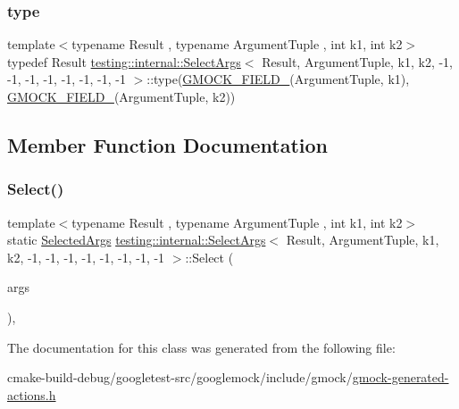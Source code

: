 \subsubsection{\texorpdfstring{type}{type}}
{\footnotesize\ttfamily template$<$typename Result , typename Argument\+Tuple , int k1, int k2$>$ \\
typedef Result \mbox{\hyperlink{classtesting_1_1internal_1_1SelectArgs}{testing\+::internal\+::\+Select\+Args}}$<$ Result, Argument\+Tuple, k1, k2, -\/1, -\/1, -\/1, -\/1, -\/1, -\/1, -\/1, -\/1 $>$\+::type(\mbox{\hyperlink{gmock-generated-actions_8h_a6eb3ce92b0613603057a20ec9e593317}{G\+M\+O\+C\+K\+\_\+\+F\+I\+E\+L\+D\+\_\+}}(Argument\+Tuple, k1), \mbox{\hyperlink{gmock-generated-actions_8h_a6eb3ce92b0613603057a20ec9e593317}{G\+M\+O\+C\+K\+\_\+\+F\+I\+E\+L\+D\+\_\+}}(Argument\+Tuple, k2))}



\subsection{Member Function Documentation}
\mbox{\label{classtesting_1_1internal_1_1SelectArgs_3_01Result_00_01ArgumentTuple_00_01k1_00_01k2_00_01-1_00_9a332764141890440172b7f06e77bbee_ab9239ba0c8afd6d36332fe5f65f12e5a}} 
\subsubsection{\texorpdfstring{Select()}{Select()}}
{\footnotesize\ttfamily template$<$typename Result , typename Argument\+Tuple , int k1, int k2$>$ \\
static \mbox{\hyperlink{classtesting_1_1internal_1_1SelectArgs_3_01Result_00_01ArgumentTuple_00_01k1_00_01k2_00_01-1_00_9a332764141890440172b7f06e77bbee_a38c94bd44f857c5e1d4136f7a283e3e1}{Selected\+Args}} \mbox{\hyperlink{classtesting_1_1internal_1_1SelectArgs}{testing\+::internal\+::\+Select\+Args}}$<$ Result, Argument\+Tuple, k1, k2, -\/1, -\/1, -\/1, -\/1, -\/1, -\/1, -\/1, -\/1 $>$\+::Select (\begin{DoxyParamCaption}\item[{const Argument\+Tuple \&}]{args }\end{DoxyParamCaption})\hspace{0.3cm}{\ttfamily [inline]}, {\ttfamily [static]}}



The documentation for this class was generated from the following file\+:\begin{DoxyCompactItemize}
\item 
cmake-\/build-\/debug/googletest-\/src/googlemock/include/gmock/\mbox{\hyperlink{gmock-generated-actions_8h}{gmock-\/generated-\/actions.\+h}}\end{DoxyCompactItemize}
